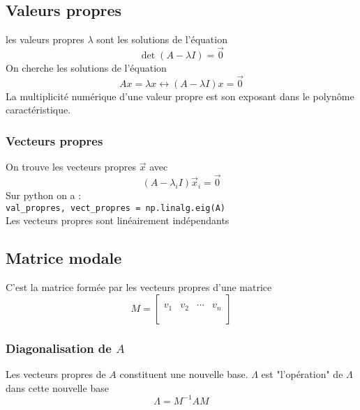\documentclass[resume]{subfiles}
\begin{document}
\subsection{Valeurs propres}
les valeurs propres $\lambda$ sont les solutions de l'équation
$$\det\left(A-\lambda I\right)=\vec{0}$$
On cherche les solutions de l'équation
$$\boxed{Ax=\lambda x}\longleftrightarrow \boxed{(A-\lambda I)x=\vec{0}}$$
La multiplicité numérique d'une valeur propre est son exposant dans le polynôme caractéristique.
\subsubsection{Vecteurs propres}
On trouve les vecteurs propres $\vec{x}$ avec
$$\left(A-\lambda_i I\right)\vec{x}_i=\vec{0}$$
Sur python on a :\\
\verb!val_propres, vect_propres = np.linalg.eig(A)!\\
Les vecteurs propres sont linéairement indépendants
\subsection{Matrice modale}
C'est la matrice formée par les vecteurs propres d'une matrice
$$M=\begin{bmatrix}
\\
v_1 & v_2 & \cdots & v_n\\
\\
\end{bmatrix}$$
\subsubsection{Diagonalisation de $A$}
Les vecteurs propres de $A$ constituent une nouvelle base. $\Lambda$ est "l'opération" de $\Lambda$ dans cette nouvelle base
$$\Lambda=M^{-1}AM$$
\end{document}
